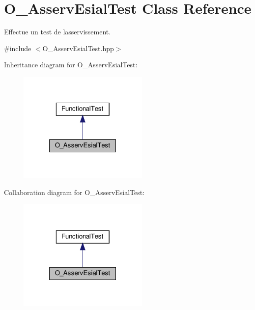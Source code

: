 \hypertarget{classO__AsservEsialTest}{}\section{O\+\_\+\+Asserv\+Esial\+Test Class Reference}
\label{classO__AsservEsialTest}


Effectue un test de l\textquotesingle{}asservissement.  




{\ttfamily \#include $<$O\+\_\+\+Asserv\+Esial\+Test.\+hpp$>$}



Inheritance diagram for O\+\_\+\+Asserv\+Esial\+Test\+:
\nopagebreak
\begin{figure}[H]
\begin{center}
\leavevmode
\includegraphics[width=181pt]{classO__AsservEsialTest__inherit__graph}
\end{center}
\end{figure}


Collaboration diagram for O\+\_\+\+Asserv\+Esial\+Test\+:
\nopagebreak
\begin{figure}[H]
\begin{center}
\leavevmode
\includegraphics[width=181pt]{classO__AsservEsialTest__coll__graph}
\end{center}
\end{figure}
